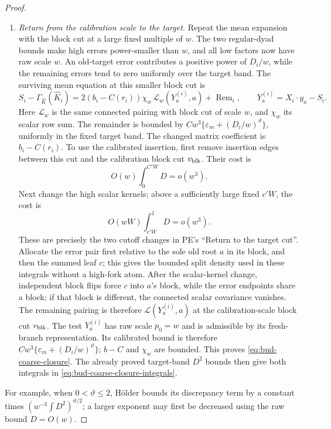 \begin{proof}
\begin{enumerate}[label=(\roman*)]
\item \emph{Return from the calibration scale to the target.}
Repeat the mean expansion with the block cut at a large fixed multiple
of \(w\). The two regular-dyad bounds make high errors power-smaller
than \(w\), and all low factors now have raw scale \(w\).
An old-target error contributes a positive power of \(D_i/w\),
while the remaining errors tend to zero uniformly over the target band.
The surviving mean equation at this smaller block cut is
\[
 S_i-\Gamma_{\widehat K}(\widehat K_i)
 =2(b_i-C(r_i))\chi_w\,
       \mathcal L_w(Y_a^{(i)},a)+\operatorname{Rem}_i,
 \qquad Y_a^{(i)}=X_i\cdot y_a-S_i.
\]
Here $\mathcal L_w$ is the same connected pairing with block cut of
scale $w$, and $\chi_w$ its scalar row sum. The remainder is bounded
by $Cw^3\{\varepsilon_m+(D_i/w)^\vartheta\}$, uniformly in the
fixed target band. The changed matrix coefficient is $b_i-C(r_i)$.
To use the calibrated insertion, first remove insertion edges between
this cut and the calibration block cut $v_{\rm blk}$. Their cost is
\[
 O(w)\int_0^{C'W}D=o(w^3).
\]
Next change the high scalar kernels; above a sufficiently large fixed
\(c'W\), the cost is
\[
 O(wW)\int_{c'W}^1D=o(w^3).
\]
These are precisely the two cutoff changes in PE's ``Return to the
target cut''. Allocate the error pair first relative to the sole old
root $a$ in its block, and then the summed leaf $c$; this gives the
bounded split density used in these integrals without a high-fork
atom. After the scalar-kernel change, independent block flips force
$c$ into $a$'s block, while the error endpoints share a block; if that
block is different, the connected scalar covariance vanishes.
The remaining pairing is therefore $\mathcal L(Y_a^{(i)},a)$ at the
calibration-scale block cut $v_{\rm blk}$. The test $Y_a^{(i)}$ has raw scale $p_0=w$ and is admissible by
its fresh-branch representation. Its calibrated bound is therefore
$Cw^3\{\varepsilon_m+(D_i/w)^\vartheta\}$; $b-C$ and $\chi_w$
are bounded. This proves \eqref{eq:bud-coarse-closure}. The already proved target-band
\(D^2\) bounds then give both integrals in
\eqref{eq:bud-coarse-closure-integrals}.
\end{enumerate}

For example, when \(0<\vartheta\le2\), H\"older bounds its discrepancy
term by a constant times
\( (w^{-3}\int D^2)^{\vartheta/2}\); a larger exponent may first
be decreased using the raw bound \(D=O(w)\).

\end{proof}


